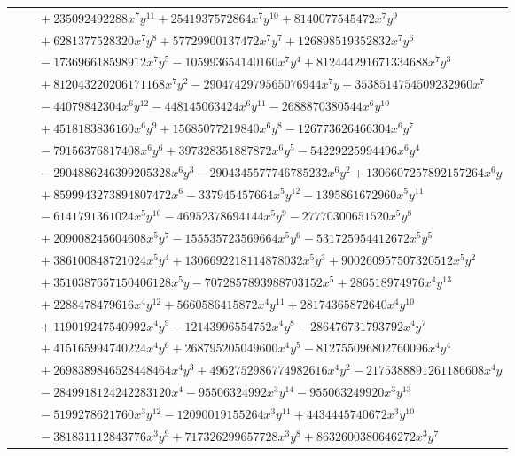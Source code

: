 \documentclass[11pt]{article}
\begin{document}
\begin{longtable}{@{}ll@{}}
 & $\quad +235092492288x^{7}y^{11}+2541937572864x^{7}y^{10}+8140077545472x^{7}y^{9}$\\
 & $\quad +6281377528320x^{7}y^{8}+57729900137472x^{7}y^{7}+126898519352832x^{7}y^{6}$\\
 & $\quad -173696618598912x^{7}y^{5}-105993654140160x^{7}y^{4}+812444291671334688x^{7}y^{3}$\\
 & $\quad +812043220206171168x^{7}y^{2}-2904742979565076944x^{7}y+3538514754509232960x^{7}$\\
 & $\quad -44079842304x^{6}y^{12}-448145063424x^{6}y^{11}-2688870380544x^{6}y^{10}$\\
 & $\quad +4518183836160x^{6}y^{9}+15685077219840x^{6}y^{8}-126773626466304x^{6}y^{7}$\\
 & $\quad -79156376817408x^{6}y^{6}+397328351887872x^{6}y^{5}-54229225994496x^{6}y^{4}$\\
 & $\quad -2904886246399205328x^{6}y^{3}-2904345577746785232x^{6}y^{2}+1306607257892157264x^{6}y$\\
 & $\quad +8599943273894807472x^{6}-337945457664x^{5}y^{12}-1395861672960x^{5}y^{11}$\\
 & $\quad -6141791361024x^{5}y^{10}-46952378694144x^{5}y^{9}-27770300651520x^{5}y^{8}$\\
 & $\quad +209008245604608x^{5}y^{7}-155535723569664x^{5}y^{6}-531725954412672x^{5}y^{5}$\\
 & $\quad +386100848721024x^{5}y^{4}+1306692218114878032x^{5}y^{3}+900260957507320512x^{5}y^{2}$\\
 & $\quad +3510387657150406128x^{5}y-7072857893988703152x^{5}+286518974976x^{4}y^{13}$\\
 & $\quad +2288478479616x^{4}y^{12}+5660586415872x^{4}y^{11}+28174365872640x^{4}y^{10}$\\
 & $\quad +119019247540992x^{4}y^{9}-12143996554752x^{4}y^{8}-286476731793792x^{4}y^{7}$\\
 & $\quad +415165994740224x^{4}y^{6}+268795205049600x^{4}y^{5}-812755096802760096x^{4}y^{4}$\\
 & $\quad +2698389846528448464x^{4}y^{3}+4962752986774982616x^{4}y^{2}-2175388891261186608x^{4}y$\\
 & $\quad -2849918124242283120x^{4}-95506324992x^{3}y^{14}-955063249920x^{3}y^{13}$\\
 & $\quad -5199278621760x^{3}y^{12}-12090019155264x^{3}y^{11}+4434445740672x^{3}y^{10}$\\
 & $\quad -381831112843776x^{3}y^{9}+717326299657728x^{3}y^{8}+8632600380646272x^{3}y^{7}$\\

\end{longtable}
\end{document}
